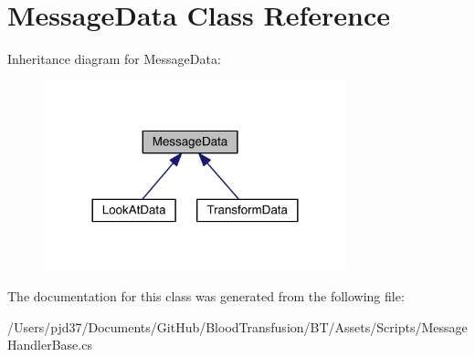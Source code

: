 \hypertarget{class_message_data}{}\section{Message\+Data Class Reference}
\label{class_message_data}


Inheritance diagram for Message\+Data\+:\nopagebreak
\begin{figure}[H]
\begin{center}
\leavevmode
\includegraphics[width=248pt]{class_message_data__inherit__graph}
\end{center}
\end{figure}


The documentation for this class was generated from the following file\+:\begin{DoxyCompactItemize}
\item 
/\+Users/pjd37/\+Documents/\+Git\+Hub/\+Blood\+Transfusion/\+B\+T/\+Assets/\+Scripts/Message\+Handler\+Base.\+cs\end{DoxyCompactItemize}
